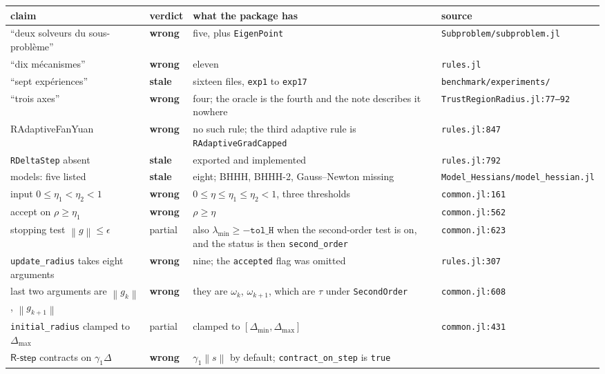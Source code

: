 \documentclass[11pt,a4paper]{article}
\providecommand{\norm}[1]{\left \lVert #1 \right \rVert}
\providecommand{\Rstep}{\textsf{R-step}}
\newcommand{\WRONG}{\textcolor{red!70!black}{\textbf{wrong}}}
\newcommand{\STALE}{\textcolor{orange!75!black}{\textbf{stale}}}
\newcommand{\PART}{\textcolor{black!60}{partial}}
\begin{document}
\begin{longtable}{p{} p{} p{} p{}}
  \toprule
  claim & verdict & what the package has & source \\
  \midrule
  \endhead
  ``deux solveurs du sous-probl\`eme'' & \WRONG & five, plus \texttt{EigenPoint}
    & \texttt{Subproblem/subproblem.jl} \\
  ``dix m\'ecanismes'' & \WRONG & eleven & \texttt{rules.jl} \\
  ``sept exp\'eriences'' & \STALE & sixteen files, \texttt{exp1} to \texttt{exp17}
    & \texttt{benchmark/experiments/} \\
  ``trois axes'' & \WRONG & four; the oracle is the fourth and the note describes
    it nowhere & \texttt{TrustRegionRadius.jl:77--92} \\
  \textsf{RAdaptiveFanYuan} & \WRONG & no such rule; the third adaptive rule is
    \texttt{RAdaptiveGradCapped} & \texttt{rules.jl:847} \\
  \texttt{RDeltaStep} absent & \STALE & exported and implemented
    & \texttt{rules.jl:792} \\
  models: five listed & \STALE & eight; BHHH, BHHH-2, Gauss--Newton missing
    & \texttt{Model\_Hessians/model\_hessian.jl} \\
  input $0 \le \eta_1 < \eta_2 < 1$ & \WRONG & $0 \le \eta \le \eta_1 \le \eta_2 < 1$,
    three thresholds & \texttt{common.jl:161} \\
  accept on $\rho \ge \eta_1$ & \WRONG & $\rho \ge \eta$ & \texttt{common.jl:562} \\
  stopping test $\norm{g} \le \epsilon$ & \PART
    & also $\lambda_{\min} \ge -\texttt{tol\_H}$ when the second-order test is on,
      and the status is then \texttt{second\_order}
    & \texttt{common.jl:623} \\
  \texttt{update\_radius} takes eight arguments & \WRONG
    & nine; the \texttt{accepted} flag was omitted
    & \texttt{rules.jl:307} \\
  last two arguments are $\norm{g_k}$, $\norm{g_{k+1}}$ & \WRONG
    & they are $\omega_k$, $\omega_{k+1}$, which are $\tau$ under
      \texttt{SecondOrder} & \texttt{common.jl:608} \\
  \texttt{initial\_radius} clamped to $\Delta_{\max}$ & \PART
    & clamped to $[\Delta_{\min}, \Delta_{\max}]$ & \texttt{common.jl:431} \\
  $\Rstep$ contracts on $\gamma_1\Delta$ & \WRONG
    & $\gamma_1\norm{s}$ by default; \texttt{contract\_on\_step} is \texttt{true}

\end{longtable}
\end{document}
